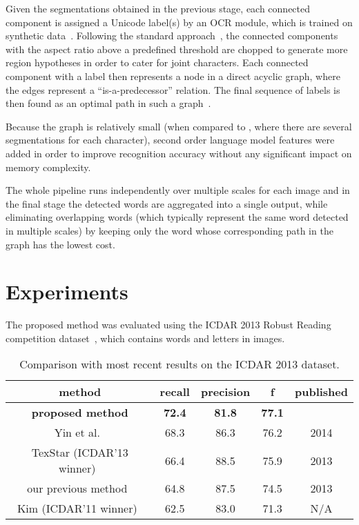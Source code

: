 \documentclass[conference]{IEEEtran}
\begin{document}
Given the segmentations obtained in the previous stage, each connected component is assigned a Unicode label(s) by an OCR module, which is trained on synthetic data~\cite{Neumann-ACCV10}. Following the standard approach~\cite{tesseract}, the connected components with the aspect ratio above a predefined threshold are chopped to generate more region hypotheses in order to cater for joint characters. Each connected component with a label then represents a node in a direct acyclic graph, where the edges represent a ``is-a-predecessor'' relation. The final sequence of labels is then found as an optimal path in such a graph~\cite{Neumann-ICDAR2013}.

Because the graph is relatively small (when compared to \cite{Neumann-ICDAR2013}, where there are several segmentations for each character), second order language model features were added in order to improve recognition accuracy without any significant impact on memory complexity.

The whole pipeline runs independently over multiple scales for each image and in the final stage the detected words are aggregated into a single output, while eliminating overlapping words (which typically represent the same word detected in multiple scales) by keeping only the word whose corresponding path in the graph has the lowest cost.






\section{Experiments}
\label{sec:experiments}
The proposed method was evaluated using the ICDAR 2013 Robust Reading competition dataset~\cite{ICDAR2013}, which contains  words and  letters in  images.

\begin{table}
\caption{Comparison with most recent results on the ICDAR 2013 dataset.}
\label{table:icdarLocalization}
\centering
\begin{tabular}{|c||cc|c||c|}
\hline
method & recall & precision & f & published \\ \hline
\textbf{proposed method} & \textbf{72.4} & \textbf{81.8} & \textbf{77.1} & \\
Yin et al.~\cite{Yin-TPAMI2013} & 68.3 & 86.3 & 76.2 & 2014 \\
TexStar (ICDAR'13 winner)~\cite{ICDAR2013} & 66.4 & 88.5 & 75.9 & 2013 \\
our previous method~\cite{Neumann-ICDAR2013} & 64.8 & 87.5 & 74.5 & 2013 \\
Kim (ICDAR'11 winner)~\cite{ICDAR2011} & 62.5 & 83.0 & 71.3 & N/A \\
\hline
\end{tabular}
\vspace{-10pt}
\end{table}
\end{document}
